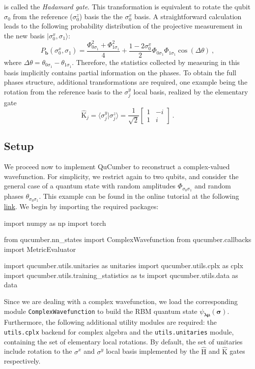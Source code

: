\documentclass[submission, Phys]{SciPost}
\begin{document}
is called the {\it Hadamard gate}. This transformation is equivalent to rotate the qubit $\sigma_0$ from the reference ($\sigma_0^z$) basis the the $\sigma_0^x$ basis. A straightforward calculation leads to the following probability distribution of the projective measurement in the new basis $|\sigma_0^x,\sigma_1\rangle$:  
\begin{equation}
P_{\bm{b}}(\sigma_0^x,\sigma_1)=\frac{\Phi_{0\sigma_1}^2+\Phi_{1\sigma_1}^2}{4}+\frac{1-2\sigma_0^x}{2}\Phi_{0\sigma_1}\Phi_{1\sigma_1}\cos(\Delta\theta)\:,
\end{equation}
where $\Delta\theta=\theta_{0\sigma_1}-\theta_{1\sigma_1}$. Therefore, the statistics collected by measuring in this basis implicitly contains partial information on the phases. To obtain the full phases structure, additional transformations are required, one example being the rotation from the reference basis to the $\sigma^y_j$ local basis, realized by
the elementary gate
\begin{equation}
\hat{\mathrm{K}}_j=\langle\sigma_j^y|\sigma_j^z\rangle=\frac{1}{\sqrt{2}}\begin{bmatrix}1 & -i\\
1 & i
\end{bmatrix}\:.
\end{equation}


\subsection{Setup}

We proceed now to implement QuCumber to reconstruct a complex-valued wavefunction. For simplicity, we restrict again to two qubits, and consider the general case of a quantum state with random amplitudes $\Phi_{\sigma_0\sigma_1}$ and random phases $\theta_{\sigma_0\sigma_1}$. This example can be found in the online tutorial at the following \href{https://github.com/PIQuIL/QuCumber/blob/master/examples/Tutorial2_TrainComplexWavefunction/tutorial_qubits.ipynb}{link}. We begin by importing the required packages:

\begin{python}
import numpy as np
import torch

from qucumber.nn_states import ComplexWavefunction
from qucumber.callbacks import MetricEvaluator

import qucumber.utils.unitaries as unitaries
import qucumber.utils.cplx as cplx
import qucumber.utils.training_statistics as ts
import qucumber.utils.data as data
\end{python}
Since we are dealing with a complex wavefunction, we load the corresponding module 
\verb|ComplexWavefunction| to build the RBM quantum state $\psi_{\bm{\lambda\mu}}(\bm{\sigma})$. Furthermore, the following additional utility modules are required: the \verb|utils.cplx| backend for complex algebra and the \verb|utils.unitaries| module, containing the set of elementary local rotations. By default, the set of unitaries include rotation to the $\sigma^x$ and $\sigma^y$ local basis implemented by the $\hat{\mathrm{H}}$ and $\hat{\mathrm{K}}$  gates respectively.
\end{document}
